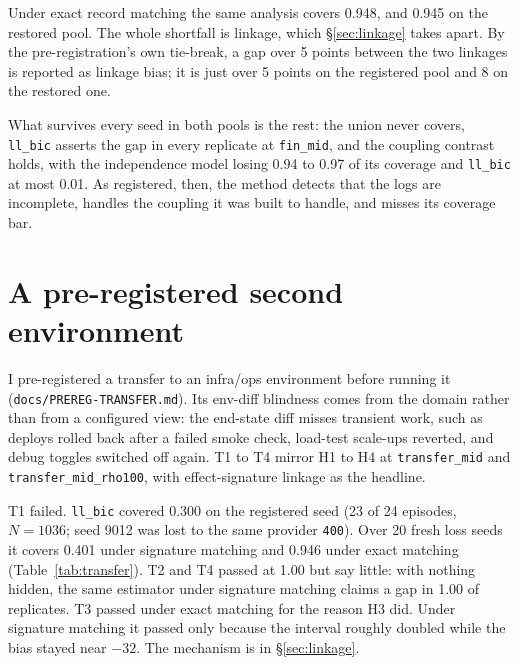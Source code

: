 \documentclass[11pt]{article}
\begin{document}
Under exact record matching the same analysis covers 0.948, and 0.945 on the
restored pool. The whole shortfall is linkage, which \S\ref{sec:linkage} takes
apart. By the pre-registration's own tie-break, a gap over 5 points between the
two linkages is reported as linkage bias; it is just over 5 points on the
registered pool and 8 on the restored one.

What survives every seed in both pools is the rest: the union never covers,
\texttt{ll\_bic} asserts the gap in every replicate at \texttt{fin\_mid}, and the
coupling contrast holds, with the independence model losing 0.94 to 0.97 of its
coverage and \texttt{ll\_bic} at most 0.01. As registered, then, the method
detects that the logs are incomplete, handles the coupling it was built to
handle, and misses its coverage bar.

\section{A pre-registered second environment}
\label{sec:transfer}

I pre-registered a transfer to an infra/ops environment before running it
(\texttt{docs/PREREG-TRANSFER.md}). Its env-diff blindness comes from the domain
rather than from a configured view: the end-state diff misses transient work,
such as deploys rolled back after a failed smoke check, load-test scale-ups
reverted, and debug toggles switched off again. T1 to T4 mirror H1 to H4 at
\texttt{transfer\_mid} and \texttt{transfer\_mid\_rho100}, with effect-signature
linkage as the headline.

T1 failed. \texttt{ll\_bic} covered 0.300 on the registered seed (23 of 24
episodes, $N = 1036$; seed 9012 was lost to the same provider \texttt{400}).
Over 20 fresh loss seeds it covers 0.401 under signature matching and 0.946 under
exact matching (Table~\ref{tab:transfer}). T2 and T4 passed at 1.00 but say
little: with nothing hidden, the same estimator under signature matching claims
a gap in 1.00 of replicates. T3 passed under exact matching for the reason H3
did. Under signature matching it passed only because the interval roughly
doubled while the bias stayed near $-32$. The mechanism is in
\S\ref{sec:linkage}.

\begin{table}[h]
\centering

\caption{The transfer environment at higher precision, by linkage. Post hoc.}
\label{tab:transfer}
\end{table}
\end{document}
